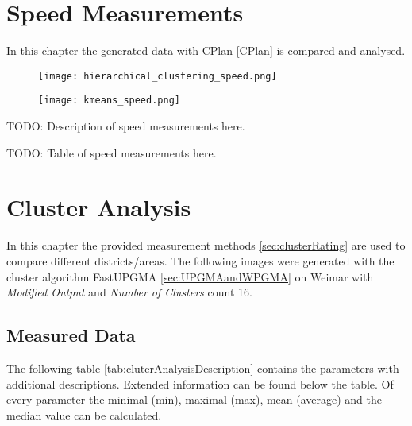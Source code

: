 \section{Speed Measurements} \label{sec:measurements-speed}
In this chapter the generated data with CPlan \ref{CPlan} is compared and analysed.

\begin{figure}
    \centering
    \begin{mdframed}[style=mdthight]
        \texttt{[image: hierarchical\_clustering\_speed.png]}
    \end{mdframed}
    \caption{\label{fig:hierarchical_clustering_speed}}
\end{figure}

\begin{figure}
    \centering
    \begin{mdframed}[style=mdthight]
        \texttt{[image: kmeans\_speed.png]}
    \end{mdframed}
    \caption{\label{fig:kmeans_speed}}
\end{figure}

TODO: Description of speed measurements here. 

TODO: Table of speed measurements here.

\section{Cluster Analysis}
\label{sec:measurements-cluster-analysis}
In this chapter the provided measurement methods \ref{sec:clusterRating} are used to compare different districts/areas. The following images were generated with the cluster algorithm FastUPGMA \ref{sec:UPGMAandWPGMA} on Weimar with \textit{Modified Output} and \textit{Number of Clusters} count 16.

\subsection{Measured Data}
\label{sec:ClusterAnalysisMeasurements}
The following table \ref{tab:cluterAnalysisDescription} contains the parameters with additional descriptions. Extended information can be found below the table. Of every parameter the minimal (min), maximal (max), mean (average) and the median value can be calculated.

